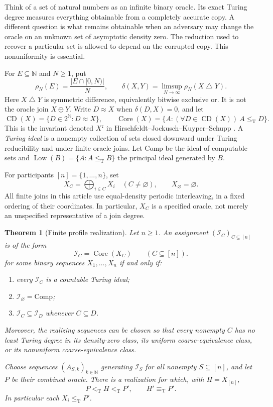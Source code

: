 \documentclass[11pt,letterpaper]{article}
\theoremstyle{plain}
\newtheorem{theorem}{Theorem}[section]
\theoremstyle{definition}
\theoremstyle{remark}
\numberwithin{equation}{section}
\newcommand{\N}{\mathbb N}
\newcommand{\Cantor}{2^{\N}}
\newcommand{\leT}{\leq_{\mathrm T}}
\newcommand{\ltT}{<_{\mathrm T}}
\newcommand{\eqT}{\equiv_{\mathrm T}}
\newcommand{\Core}{\operatorname{Core}}
\newcommand{\CD}{\operatorname{CD}}
\newcommand{\Low}{\operatorname{Low}}
\newcommand{\Comp}{\mathrm{Comp}}
\newcommand{\bitsum}{\mathbin{\triangle}}
\newcommand{\join}{\mathbin{\oplus}}
\newcommand{\I}{\mathcal I}
\begin{document}
Think of a set of natural numbers as an infinite binary oracle. Its exact
Turing degree measures everything obtainable from a completely accurate
copy. A different question is what remains obtainable when an adversary may
change the oracle on an unknown set of asymptotic density zero. The reduction
used to recover a particular set is allowed to depend on the corrupted
copy. This nonuniformity is essential.

For $E\subseteq\N$ and $N\geq1$, put
\[
 \rho_N(E)=\frac{|E\cap[0,N)|}{N},\qquad
 \delta(X,Y)=\limsup_{N\to\infty}\rho_N(X\bitsum Y).
\]
Here $X\bitsum Y$ is symmetric difference, equivalently bitwise exclusive
or. It is not the oracle join $X\join Y$. Write $D\approx X$ when
$\delta(D,X)=0$, and let
\[
 \CD(X)=\{D\in\Cantor:D\approx X\},\qquad
 \Core(X)=\{A:(\forall D\in\CD(X))\ A\leT D\}.
\]
This is the invariant denoted $X^{\mathfrak c}$ in
Hirschfeldt--Jockusch--Kuyper--Schupp \cite{HJKS}. A \emph{Turing ideal} is a
nonempty collection of sets closed downward under Turing reducibility and
under finite oracle joins. Let $\Comp$ be the ideal of computable sets and
$\Low(B)=\{A:A\leT B\}$ the principal ideal generated by $B$.

For participants $[n]=\{1,\ldots,n\}$, set
\[
 X_C=\bigoplus_{i\in C}X_i\quad(C\ne\varnothing),\qquad
 X_\varnothing=\varnothing.
\]
All finite joins in this article use equal-density periodic interleaving,
in a fixed ordering of their coordinates. In particular, $X_C$ is a
specified oracle, not merely an unspecified representative of a join degree.

\begin{theorem}[Finite profile realization]\label{cr11:thm:main}
Let $n\geq1$. An assignment $(\I_C)_{C\subseteq[n]}$ is of the form
\begin{equation}\label{cr11:eq:profile}
                \I_C=\Core(X_C)\qquad(C\subseteq[n]).
\end{equation}
for some binary sequences $X_1,\ldots,X_n$ if and only if:
\begin{enumerate}[label=\textup{(\roman*)}]
\item every $\I_C$ is a countable Turing ideal;
\item $\I_\varnothing=\Comp$;
\item $\I_C\subseteq\I_D$ whenever $C\subseteq D$.
\end{enumerate}
Moreover, the realizing sequences can be chosen so that every nonempty
$C$ has \emph{no least Turing degree} in its density-zero class, its uniform
coarse-equivalence class, or its nonuniform coarse-equivalence class.

Choose sequences $(A_{S,k})_{k\in\N}$ generating $\I_S$ for all nonempty
$S\subseteq[n]$, and let $P$ be their combined oracle. There is a realization
for which, with $H=X_{[n]}$,
\begin{equation}\label{cr11:eq:jumpbound}
      P\ltT H\ltT P',\qquad H'\eqT P'.
\end{equation}
In particular each $X_i\leT P'$.
\end{theorem}
\end{document}
